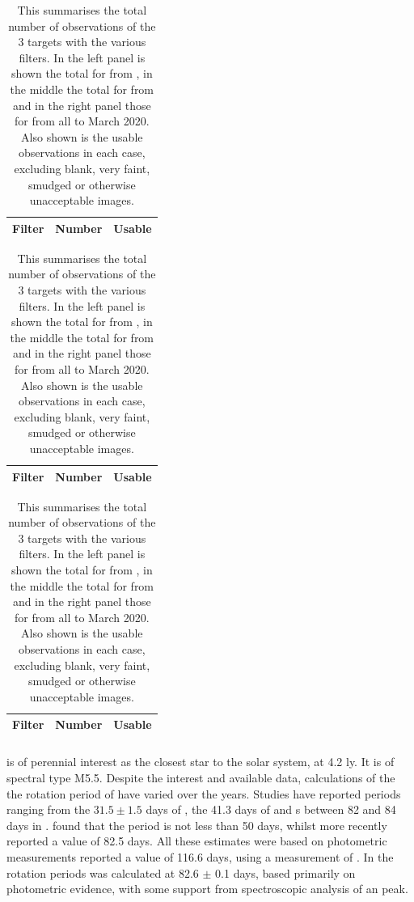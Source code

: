 \begin{table}[!htbp]
\begin{minipage}{.33\linewidth}
\centering
\begin{tabular}{lrr} \hline
Filter & Number & Usable \\\hline

\hline
\end{tabular}
\end{minipage}
\begin{minipage}{.33\linewidth}
\centering
\begin{tabular}{lrr} \hline
Filter & Number & Usable \\\hline

\hline
\end{tabular}
\end{minipage}
\begin{minipage}{.33\linewidth}
\centering
\begin{tabular}{lrr} \hline
Filter & Number & Usable\\\hline

\hline
\end{tabular}
\end{minipage}
\caption{This summarises the total number of observations of the 3 {\rdwarf}
targets with the various filters. In the left panel is
shown the total for {\prox} from , in the middle the
total for {\bstar} from  and in the right panel those for
{\ross} from  all to March 2020. Also shown is the
usable observations in each case, excluding blank, very faint, smudged or
otherwise unacceptable images.} \protect\label{table:proxsumm}
\protect\label{table:bstarsumm} \protect\label{table:rosssumm}
\end{table}

\subsubsection{\prox}

{\prox} is of perennial interest as the closest star to the solar system, at 4.2 ly. It is of spectral type M5.5.
Despite the interest and available data, calculations of the the rotation period
of {\prox} have varied over the years.  Studies have reported periods
ranging from the $ 31.5 \pm 1.5 $ days of \citet{guinan96}, the 41.3 days of \citet{benedict93}
and s between 82 and 84 days in \citealt{benedict92,benedict98}.  \citet{kurster99} found that the period is not less
than 50 days, whilst more recently \citet{kiraga07} reported a value of 82.5
days. All these estimates were based on photometric measurements \citet[Table 3]{suarezmascareno15} reported a value of 116.6 days, using a
measurement of {\ha}. In \citet{collins17} the rotation periods was calculated
at 82.6 $\pm$ 0.1 days, based primarily on photometric evidence, with some
support from spectroscopic analysis of an {\ha} peak.

